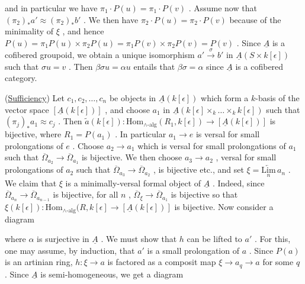 \begin{center}
\end{center}
and in particular we have $\pi_1\cdot P(u) = \pi_1\cdot P(v)$ . Assume now that $(\pi_2)_*a' \approx (\pi_2)_*b'$ . We then have $\pi_2\cdot P(u) = \pi_2\cdot P(v)$ because of the minimality of
$\xi$ , and hence  $P(u) = \pi_1 P(u)\times \pi_2 P(u) = \pi_1 P(v)\times \pi_2 P(v) = P(v)$  . Since  $\underline{A}$  is a cofibered groupoid, we obtain a unique isomorphism  $a' \overset{\sigma}{\to} b'$  in $\underline{A}(S\times k[\epsilon])$  such that  $\sigma u = v$  . Then  $\beta\sigma u = \alpha u$  entails that  $\beta\sigma= \alpha$  since  $\underline{A}$ is a cofibered category.

(\underline{Sufficiency}) Let  $c_1,c_2,\dots,c_n$  be objects in  $\underline{A}(k[\epsilon])$  which form a $k$-basis of the vector space  $[\underline{A}(k[\epsilon])]$  , and choose  $a_1$  in  $\underline{A}(k[\epsilon]\times_k\dots\times_k k[\epsilon])$ such that  $(\pi_j)_* a_1 \approx c_j$  . Then  $\tilde{a}(k[\epsilon]) : \mathrm{Hom}_{\wedge\text{-alg}}(R_1,k[\epsilon]) \to [\underline{A}(k[\epsilon])]$  is bijective, where  $R_1 = P(a_1)$  . In particular  $a_1 \to e$  is versal for small prolongations of  $e$  . Choose  $a_2 \to a_1$  which is versal for small prolongations of  $a_1$ such that  $\overline{\Omega}_{a_2} \to \overline{\Omega}_{a_1}$  is bijective. We then choose  $a_3 \to a_2$  , versal for small prolongations of  $a_2$  such that  $\overline{\Omega}_{a_3} \to \overline{\Omega}_{a_2}$  , is bijective etc., and set $\xi = \underset{n}{\underleftarrow{\mathrm{Lim}}}\, a_n$  . We claim that  $\xi$  is a minimally-versal formal object of  $\underline{A}$  . Indeed, since  $\overline{\Omega}_{a_n} \to \overline{\Omega}_{a_{n-1}}$  is bijective, for all  $n$  ,  $\overline{\Omega}_{\xi} \to \overline{\Omega}_{a_1}$  is bijective so that $\xi(k[\epsilon]) : \mathrm{Hom}_{\wedge\text{-alg}}(R,k[\epsilon] \to [\underline{A}(k[\epsilon])]$  is bijective. Now consider a diagram

\begin{center}
\end{center}
where  $\alpha$  is surjective in  $\underline{A}$  . We must show that  $h$  can be lifted to  $a'$  . For this, one may assume, by induction, that  $a'$  is a small prolongation of  $a$  . Since  $P(a)$  is an artinian ring,  $h : \xi \to a$  is factored as a composit map $\xi \to a_q \longrightarrow a$  for some  $q$  . Since  $\underline{A}$  is semi-homogeneous, we get a diagram

